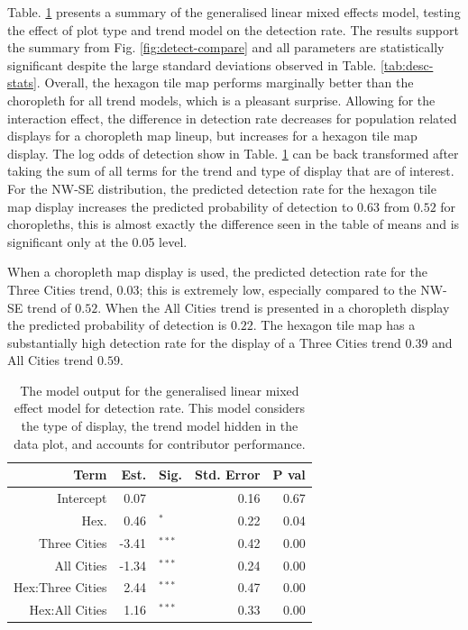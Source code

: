\documentclass[12pt]{article}
\begin{document}
Table. \ref{tab:detect-glmer1} presents a summary of the generalised
linear mixed effects model, testing the effect of plot type and trend
model on the detection rate. The results support the summary from Fig.
\ref{fig:detect-compare} and all parameters are statistically
significant despite the large standard deviations observed in Table.
\ref{tab:desc-stats}. Overall, the hexagon tile map performs marginally
better than the choropleth for all trend models, which is a pleasant
surprise. Allowing for the interaction effect, the difference in
detection rate decreases for population related displays for a
choropleth map lineup, but increases for a hexagon tile map display. The
log odds of detection show in Table. \ref{tab:detect-glmer1} can be back
transformed after taking the sum of all terms for the trend and type of
display that are of interest. For the NW-SE distribution, the predicted
detection rate for the hexagon tile map display increases the predicted
probability of detection to \(0.63\) from \(0.52\) for choropleths, this
is almost exactly the difference seen in the table of means and is
significant only at the 0.05 level.

When a choropleth map display is used, the predicted detection rate for
the Three Cities trend, \(0.03\); this is extremely low, especially
compared to the NW-SE trend of \(0.52\). When the All Cities trend is
presented in a choropleth display the predicted probability of detection
is \(0.22\). The hexagon tile map has a substantially high detection
rate for the display of a Three Cities trend \(0.39\) and All Cities
trend \(0.59\).

\begin{table}

\caption{\label{tab:detect-glmer1}The model output for the generalised linear mixed effect model for detection rate. This model considers the type of display, the trend model hidden in the data plot, and accounts for contributor performance.}
\centering
\begin{tabular}[t]{rrlrr}
\toprule
Term & Est. & Sig. & Std. Error & P val\\
\midrule
Intercept & 0.07 & $^{ }$ & 0.16 & 0.67\\
Hex. & 0.46 & $^{*}$ & 0.22 & 0.04\\
\addlinespace
Three Cities & -3.41 & $^{***}$ & 0.42 & 0.00\\
All Cities & -1.34 & $^{***}$ & 0.24 & 0.00\\
\addlinespace
Hex:Three Cities & 2.44 & $^{***}$ & 0.47 & 0.00\\
Hex:All Cities & 1.16 & $^{***}$ & 0.33 & 0.00\\
\bottomrule
\end{tabular}
\end{table}
\end{document}
